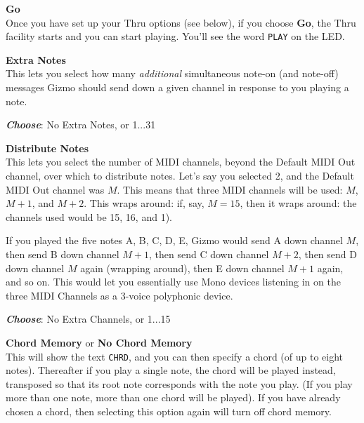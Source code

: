 \documentclass{article}
\begin{document}
	\begin{description}
	
	\item{\bf Go}\\
		Once you have set up your Thru options (see below), if you choose {\bf Go}, the Thru facility starts and you can start playing.  You'll see the word \texttt{PLAY} on the LED.

	\item{\bf Extra Notes}\\
		This lets you select how many {\it additional} simultaneous note-on (and note-off) messages Gizmo should send down a given channel in response to you playing a note.
		\begin{description}
		\item{\bf \textit{Choose}}: No Extra Notes, or 1...31 \hspace{3in} 
		\end{description}

	\item{\bf Distribute Notes}\\
		This lets you select the number of MIDI channels, beyond the Default MIDI Out channel, over which to distribute notes.  Let's say you selected 2, and the Default MIDI Out channel was \(M\).  This means that three MIDI channels will be used: \(M\), \(M+1\), and \(M+2\).  This wraps around: if, say, \(M = 15\), then it wraps around: the channels used would be 15, 16, and 1).
		
		If you played the five notes A, B, C, D, E, Gizmo would send A down channel \(M\), then send B down channel \(M + 1\), then send C down channel \(M + 2\), then send D down channel \(M\) again (wrapping around), then E down channel \(M+1\) again, and so on.  This would let you essentially use Mono devices listening in on the three MIDI Channels as a 3-voice polyphonic device.
		
		\begin{description}
		\item{\bf \textit{Choose}}: No Extra Channels, or 1...15 \hspace{2.8in}\smash{\texttt{[image: none.pdf]}} 
		\end{description}

	\item{\bf Chord Memory} or {\bf No Chord Memory}\\
		This will show the text \texttt{CHRD}, and you can then specify a chord (of up to eight notes).  Thereafter if you play a single note, the chord will be played instead, transposed so that its root note corresponds with the note you play. (If you play more than one note, more than one chord will be played).  If you have already chosen a chord, then selecting this option again will turn off chord memory.
				

\end{description}
\end{document}
